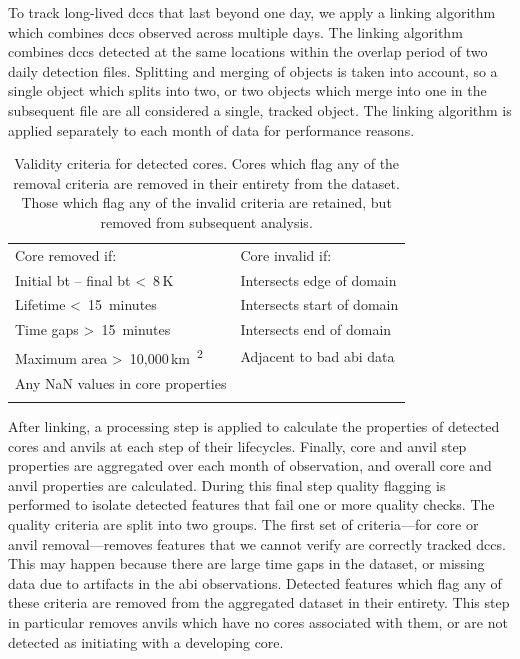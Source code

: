 To track long-lived \acrshort{dcc}s that last beyond one day, we apply a linking algorithm which combines \acrshort{dcc}s observed across multiple days.
The linking algorithm combines \acrshort{dcc}s detected at the same locations within the overlap period of two daily detection files.
Splitting and merging of objects is taken into account, so a single object which splits into two, or two objects which merge into one in the subsequent file are all considered a single, tracked object.
The linking algorithm is applied separately to each month of data for performance reasons.

\begin{table}[b]
\centering
\begin{tabular}{ll}
\tophline
Core removed if:                                                    & Core invalid if: \\
\middlehline
Initial \acrshort{bt} -- final \acrshort{bt} \textless~8\,\unit{K}  & Intersects edge of domain \\
Lifetime \textless~15~minutes                                       & Intersects start of domain \\
Time gaps \textgreater~15~minutes                                   & Intersects end of domain \\
Maximum area \textgreater~10,000\,\unit{km\textsuperscript{2}}      & Adjacent to bad \acrshort{abi} data \\
Any NaN values in core properties                                   & \\
\bottomhline
\end{tabular}
\caption[
Validity criteria for detected cores
]{
Validity criteria for detected cores. Cores which flag any of the removal criteria are removed in their entirety from the dataset. Those which flag any of the invalid criteria are retained, but removed from subsequent analysis.}
\label{table:core_validity_criteria}
\end{table}

After linking, a processing step is applied to calculate the properties of detected cores and anvils at each step of their lifecycles.
Finally, core and anvil step properties are aggregated over each month of observation, and overall core and anvil properties are calculated.
During this final step quality flagging is performed to isolate detected features that fail one or more quality checks.
The quality criteria are split into two groups.
The first set of criteria---for core or anvil removal---removes features that we cannot verify are correctly tracked \acrshort{dcc}s.
This may happen because there are large time gaps in the dataset, or missing data due to artifacts in the \acrshort{abi} observations.
Detected features which flag any of these criteria are removed from the aggregated dataset in their entirety.
This step in particular removes anvils which have no cores associated with them, or are not detected as initiating with a developing core.


